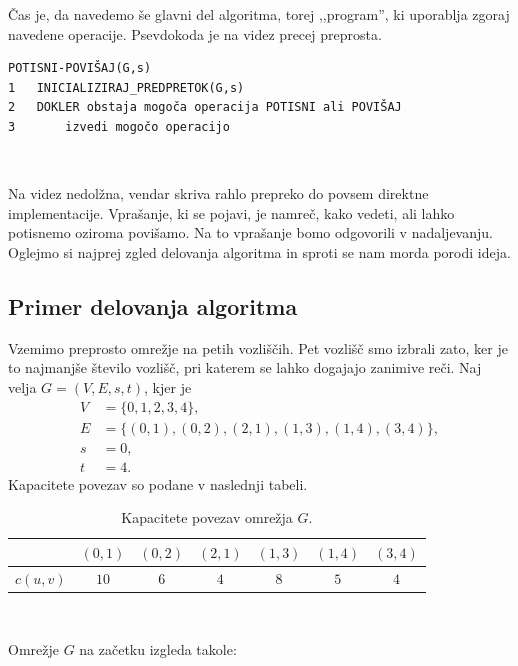 \documentclass[mat1]{fmfdelo}
\begin{document}
Čas je, da navedemo še glavni del algoritma, torej ,,program'', ki uporablja zgoraj navedene operacije. Psevdokoda je na videz precej preprosta.\\

\begin{verbatim}
POTISNI-POVIŠAJ(G,s)
1   INICIALIZIRAJ_PREDPRETOK(G,s)
2   DOKLER obstaja mogoča operacija POTISNI ali POVIŠAJ
3       izvedi mogočo operacijo
\end{verbatim}~

Na videz nedolžna, vendar skriva rahlo prepreko do povsem direktne im\-ple\-men\-ta\-ci\-je. Vprašanje, ki se pojavi, je namreč, kako vedeti, ali lahko potisnemo oziroma po\-vi\-ša\-mo. Na to vprašanje bomo odgovorili v nadaljevanju. Oglejmo si najprej zgled delovanja algoritma in sproti se nam morda porodi ideja.\\

\subsection{Primer delovanja algoritma}

Vzemimo preprosto omrežje na petih vozliščih. Pet vozlišč smo izbrali zato, ker je to najmanjše število vozlišč, pri katerem se lahko dogajajo zanimive reči. Naj velja $G = (V, E, s, t)$, kjer je
\begin{align*}
	V &= \{0,1,2,3,4\},\\
	E &= \{(0,1), (0,2), (2,1), (1,3), (1,4), (3,4)\},\\
	s &= 0,\\
	t &= 4.
\end{align*}
Kapacitete povezav so podane v naslednji tabeli.

\begin{table}[h!]
\centering
\caption{Kapacitete povezav omrežja $G$.}
\begin{tabular}{|l|c|c|c|c|c|c|}
\hline
         & $(0,1)$ & $(0,2)$ & $(2,1)$ & $(1,3)$ & $(1,4)$ & $(3,4)$\\ \hline
$c(u,v)$ &   $10$  &   $6$   &   $4$   &   $8$   &   $5$   &   $4$  \\ \hline
\end{tabular}
\end{table}~

Omrežje $G$ na začetku izgleda takole:
\end{document}
